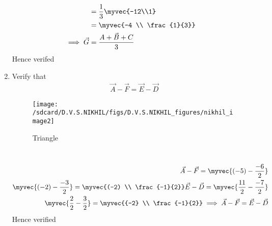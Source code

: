 \documentclass[11pt]{book}
\begin{document}
\begin{enumerate}[label=\thesection.\arabic*.,ref=\thesection.\theenumi]
\begin{align}
		      \\
		      &=\frac{1}{3}\myvec{-12\\1}
		      \\
		      &=\myvec{-4 \\ \frac{1}{3}}	     
		      \\
		      \implies \vec{G}&=\frac{\vec{A+B+C}}{3}	      
               \end{align}     
	       Hence verifed\\
\item Verify that
	\begin{align}
		\vec{A}-\vec{F}=\vec{E}-\vec{D}
	\end{align}
	\begin{figure}
		\texttt{[image: /sdcard/D.V.S.NIKHIL/figs/D.V.S.NIKHIL\_figures/nikhil\_image2]}
		\caption{Triangle}
		\label{fig1.3:Triangle}
	\end{figure}
         \\
	 \solution
\begin{align}
	\vec{A}-\vec{F}=\myvec{(-5) - \frac{-6}{2}} \\ 
	\myvec{(-2) -\frac{-3}{2}}=\myvec{(-2) \\ \frac{-1}{2}}
	\vec{E}-\vec{D}=\myvec{\frac{11}{2}-\frac{-7}{2}}\\         	\myvec{\frac{2}{2}-\frac{3}{2}}
	=\myvec{{-2} \\ \frac{-1}{2}}
	\implies \vec{A}-\vec{F}=\vec{E}-\vec{D}	
\end{align}
Hence verified\\
\end{enumerate}
\end{document}
